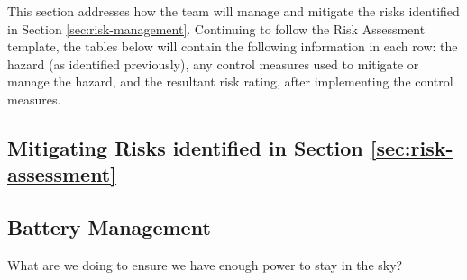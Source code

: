 \label{sec:risk-management}
This section addresses how the team will manage and mitigate the risks identified in Section \ref{sec:risk-management}. Continuing to follow the Risk Assessment template, the tables below will contain the following information in each row: the hazard (as identified previously), any control measures used to mitigate or manage the hazard, and the resultant risk rating, after implementing the control measures.\\

\subsection{Mitigating Risks identified in Section \ref{sec:risk-assessment}}

\subsection{Battery Management}
What are we doing to ensure we have enough power to stay in the sky?